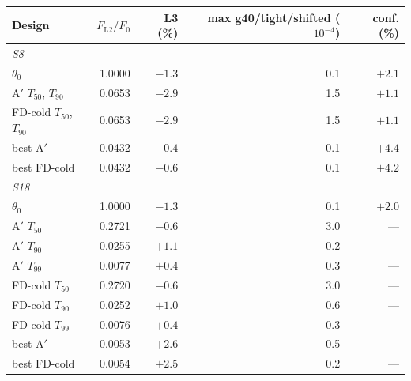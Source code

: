 \begin{tabular}{lrrrr}\toprule
Design & $F_{\mathrm{L2}}/F_0$ & L3 (\%) & max g40/tight/shifted ($10^{-4}$) & conf. (\%)\\\midrule
\multicolumn{5}{l}{\emph{S8}}\\
$\theta_0$ & 1.0000 & $-1.3$ & 0.1 & $+2.1$ \\
A$'$ $T_{50}$, $T_{90}$ & 0.0653 & $-2.9$ & 1.5 & $+1.1$ \\
FD-cold $T_{50}$, $T_{90}$ & 0.0653 & $-2.9$ & 1.5 & $+1.1$ \\
best A$'$ & 0.0432 & $-0.4$ & 0.1 & $+4.4$ \\
best FD-cold & 0.0432 & $-0.6$ & 0.1 & $+4.2$ \\
\multicolumn{5}{l}{\emph{S18}}\\
$\theta_0$ & 1.0000 & $-1.3$ & 0.1 & $+2.0$ \\
A$'$ $T_{50}$ & 0.2721 & $-0.6$ & 3.0 & --- \\
A$'$ $T_{90}$ & 0.0255 & $+1.1$ & 0.2 & --- \\
A$'$ $T_{99}$ & 0.0077 & $+0.4$ & 0.3 & --- \\
FD-cold $T_{50}$ & 0.2720 & $-0.6$ & 3.0 & --- \\
FD-cold $T_{90}$ & 0.0252 & $+1.0$ & 0.6 & --- \\
FD-cold $T_{99}$ & 0.0076 & $+0.4$ & 0.3 & --- \\
best A$'$ & 0.0053 & $+2.6$ & 0.5 & --- \\
best FD-cold & 0.0054 & $+2.5$ & 0.2 & --- \\
\bottomrule\end{tabular}
